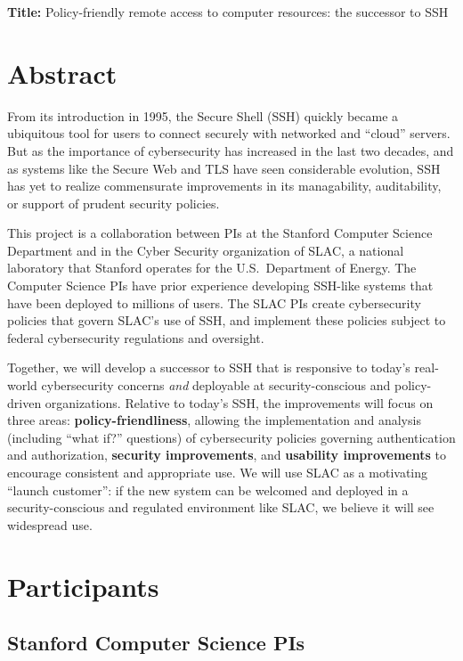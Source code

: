 \documentclass[11pt]{article}
\begin{document}
\noindent \textbf{Title:} Policy-friendly remote access to computer resources: the successor to SSH

\section*{Abstract}

From its introduction in 1995, the Secure Shell (SSH) quickly became a
ubiquitous tool for users to connect securely with networked and
``cloud'' servers. But as the importance of cybersecurity has
increased in the last two decades, and as systems like the Secure Web
and TLS have seen considerable evolution, SSH has yet to realize
commensurate improvements in its managability, auditability, or
support of prudent security policies.

This project is a collaboration between PIs at the Stanford Computer
Science Department and in the Cyber Security organization of SLAC, a
national laboratory that Stanford operates for the U.S.~Department of
Energy. The Computer Science PIs have prior experience developing
SSH-like systems that have been deployed to millions of users. The
SLAC PIs create cybersecurity policies that govern SLAC's use of SSH,
and implement these policies subject to federal cybersecurity regulations and oversight.

Together, we will develop a successor to SSH that is responsive to
today's real-world cybersecurity concerns \emph{and} deployable at
security-conscious and policy-driven organizations. Relative to
today's SSH, the improvements will focus on three areas:
\textbf{policy-friendliness}, allowing the implementation and analysis
(including ``what if?'' questions) of cybersecurity policies governing
authentication and authorization, \textbf{security improvements}, and
\textbf{usability improvements} to encourage consistent and
appropriate use. We will use SLAC as a motivating ``launch customer'':
if the new system can be welcomed and deployed in a security-conscious
and regulated environment like SLAC, we believe it will see widespread
use.

\section{Participants}

\subsection{Stanford Computer Science PIs}
\end{document}

